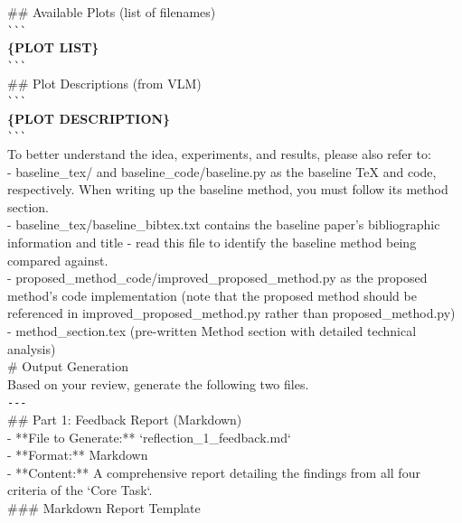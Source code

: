 \begin{tcolorbox}[colback=gray!10, colframe=gray!40!black, breakable=true, title=Prompt for Feedback Generation]
\#\# Available Plots (list of filenames)\\
\verb|```|\\
\textbf{\{PLOT LIST\}}\\
\verb|```|\\

\#\# Plot Descriptions (from VLM)\\
\verb|```|\\
\textbf{\{PLOT DESCRIPTION\}}\\
\verb|```|\\

To better understand the idea, experiments, and results, please also refer to:\\
- baseline\_tex/ and baseline\_code/baseline.py as the baseline TeX and code, respectively. When writing up the baseline method, you must follow its method section.\\
- baseline\_tex/baseline\_bibtex.txt contains the baseline paper's bibliographic information and title - read this file to identify the baseline method being compared against.\\
- proposed\_method\_code/improved\_proposed\_method.py as the proposed method's code implementation (note that the proposed method should be referenced in improved\_proposed\_method.py rather than proposed\_method.py)\\
- method\_section.tex (pre-written Method section with detailed technical analysis)\\

\# Output Generation\\
Based on your review, generate the following two files.\\

\verb|---|\\
\#\# Part 1: Feedback Report (Markdown)\\
- **File to Generate:** `reflection\_1\_feedback.md`\\
- **Format:** Markdown\\
- **Content:** A comprehensive report detailing the findings from all four criteria of the `Core Task`.\\

\#\#\# Markdown Report Template\\


\end{tcolorbox}
